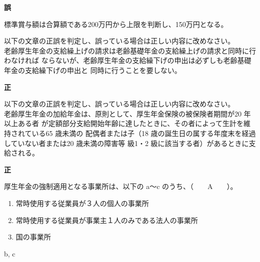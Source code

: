 \begin{answerbox}
  \textbf{誤}

  標準賞与額は合算額である200万円から上限を判断し、150万円となる。
\end{answerbox}

\begin{truefalse}[年金1 2019 問題2(2)\textcircled{2}]
以下の文章の正誤を判定し、誤っている場合は正しい内容に改めなさい。\\

  老齢厚生年金の支給繰上げの請求は老齢基礎年金の支給繰上げの請求と同時に行わなければ
ならないが、老齢厚生年金の支給繰下げの申出は必ずしも老齢基礎年金の支給繰下げの申出と
同時に行うことを要しない。
\end{truefalse}

\begin{answerbox}
  \textbf{正}
\end{answerbox}


\begin{truefalse}[年金1 2019 問題2(2)\textcircled{3}]
以下の文章の正誤を判定し、誤っている場合は正しい内容に改めなさい。\\

  老齢厚生年金の加給年金は、原則として、厚生年金保険の被保険者期間が20 年以上ある者
が定額部分支給開始年齢に達したときに、その者によって生計を維持されている65 歳未満の
配偶者または子（18 歳の誕生日の属する年度末を経過していない者または20 歳未満の障害等
級1・2 級に該当する者）があるときに支給される。
\end{truefalse}


\begin{answerbox}
  \textbf{正}
\end{answerbox}

\begin{fillblank}[年金1 2018 問題1(4)\textcircled{4}]
  厚生年金の強制適用となる事業所は、以下の a～c のうち、（　　A　　）。
  \begin{enumerate}[a ]
    \item 常時使用する従業員が３人の個人の事業所
    \item 常時使用する従業員が事業主１人のみである法人の事業所
    \item  国の事業所
  \end{enumerate}

\end{fillblank}


\begin{answerbox}
  b, c
\end{answerbox}

